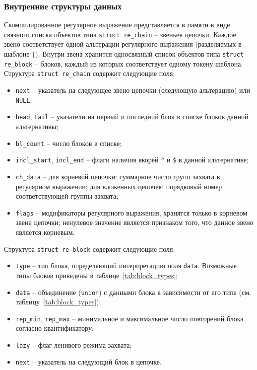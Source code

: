 \subsubsection{Внутренние структуры данных}

Скомпилированное регулярное выражение представляется в памяти в виде связного списка объектов типа \verb`struct re_chain` -- звеньев цепочки. Каждое звено соответствует одной альтерации регулярного выражения (разделяемых в шаблоне \verb`|`). Внутри звена хранится односвязный список объектов типа \verb`struct re_block` -- блоков, каждый из которых соответствует одному токену шаблона. Структура \verb`struct re_chain` содержит следующие поля:

\begin{itemize}
	\item \verb`next` -- указатель на следующее звено цепочки (следующую альтерацию) или \verb`NULL`;
	\item \verb`head`, \verb`tail` -- указатели на первый и последний блок в списке блоков данной альтернативы;
	\item \verb`bl_count` -- число блоков в списке;
	\item \verb`incl_start`, \verb`incl_end` -- флаги наличия якорей \verb`^` и \verb`$` в данной альтернативе;
	\item \verb`ch_data` -- для корневой цепочки: суммарное число групп захвата в регулярном выражении; для вложенных цепочек: порядковый номер соответствующей группы захвата;
	\item \verb`flags` -- модификаторы регулярного выражения, хранятся только в корневом звене цепочки; ненулевое значение является признаком того, что данное звено является корневым.
\end{itemize}

Структура \verb`struct re_block` содержит следующие поля:

\begin{itemize}
	\item \verb`type` -- тип блока, определяющий интерпретацию
	поля \verb`data`. Возможные типы блоков приведены
	в таблице~\ref{tab:block_types};
	\item \verb`data` -- объединение (\verb`union`) с данными блока в зависимости от его типа (см. таблицу~\ref{tab:block_types});
	\item \verb`rep_min`, \verb`rep_max` -- минимальное и максимальное число повторений блока согласно квантификатору;
	\item \verb`lazy` -- флаг ленивого режима захвата;
	\item \verb`next` -- указатель на следующий блок в цепочке.
\end{itemize}

